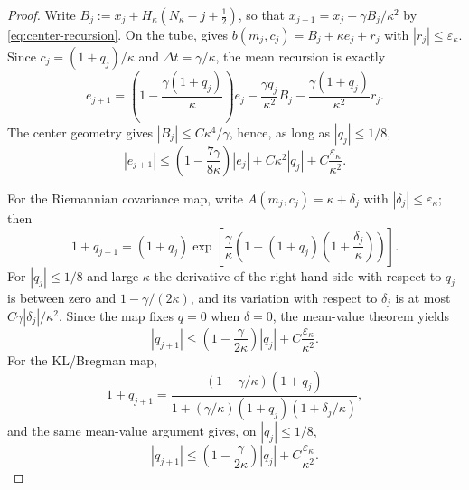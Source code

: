 \begin{proof}
    Write $B_j:=x_j+H_\kappa(N_\kappa-j+\tfrac12)$, so that
    $x_{j+1}=x_j-\gamma B_j/\kappa^2$ by \eqref{eq:center-recursion}. On the tube,
     gives $b(m_j,c_j)=B_j+\kappa e_j+r_j$ with
    $|r_j|\leq\varepsilon_\kappa$. Since $c_j=(1+q_j)/\kappa$ and
    $\Delta t=\gamma/\kappa$, the mean recursion is exactly
    \begin{equation}\label{eq:mean-shadow-recursion}
        e_{j+1}
        =\left(1-\frac{\gamma(1+q_j)}\kappa\right)e_j
         -\frac{\gamma q_j}{\kappa^2}B_j
         -\frac{\gamma(1+q_j)}{\kappa^2}r_j .
    \end{equation}
    The center geometry gives $|B_j|\leq C\kappa^4/\gamma$, hence, as long as
    $|q_j|\leq1/8$,
    \begin{equation}\label{eq:mean-shadow-bound}
        |e_{j+1}|
        \leq\left(1-\frac{7\gamma}{8\kappa}\right)|e_j|
        +C\kappa^2|q_j|
        +C\frac{\varepsilon_\kappa}{\kappa^2}.
    \end{equation}

    For the Riemannian covariance map, write $A(m_j,c_j)=\kappa+\delta_j$ with
    $|\delta_j|\leq\varepsilon_\kappa$; then
    \begin{equation}\label{eq:q-R-exact}
        1+q_{j+1}
        =(1+q_j)\exp\left[\frac\gamma\kappa
        \left(1-(1+q_j)\left(1+\frac{\delta_j}\kappa\right)\right)\right].
    \end{equation}
    For $|q_j|\leq1/8$ and large $\kappa$ the derivative of the right-hand side with respect to
    $q_j$ is between zero and $1-\gamma/(2\kappa)$, and its variation with respect to $\delta_j$
    is at most $C\gamma|\delta_j|/\kappa^2$. Since the map fixes $q=0$ when $\delta=0$, the
    mean-value theorem yields
    \begin{equation}\label{eq:q-R-bound}
        |q_{j+1}|
        \leq\left(1-\frac\gamma{2\kappa}\right)|q_j|+C\frac{\varepsilon_\kappa}{\kappa^2}.
    \end{equation}
    For the KL/Bregman map,
    \begin{equation}\label{eq:q-KL-exact}
        1+q_{j+1}
        =\frac{(1+\gamma/\kappa)(1+q_j)}
               {1+(\gamma/\kappa)(1+q_j)(1+\delta_j/\kappa)},
    \end{equation}
    and the same mean-value argument gives, on $|q_j|\leq1/8$,
    \begin{equation}\label{eq:q-KL-bound}
        |q_{j+1}|
        \leq\left(1-\frac\gamma{2\kappa}\right)|q_j|+C\frac{\varepsilon_\kappa}{\kappa^2}.
    \end{equation}


\end{proof}
